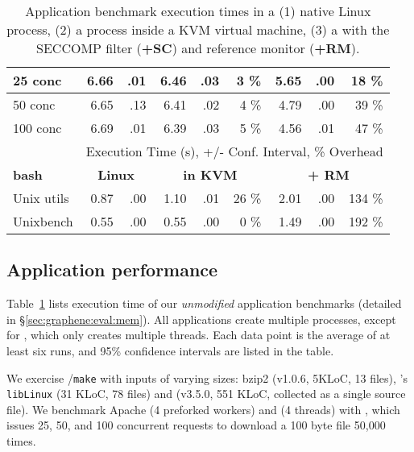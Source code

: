 \begin{table}[t!b!]
\begin{tabular}{|l|rr|rrr|rrr|}
25 conc    & 6.66 &.01 &6.46 &.03 &3 \% &5.65 &.00 &18 \%  \\\hline
50 conc    & 6.65 &.13 &6.41 &.02 &4 \% &4.79 &.00 &39 \%  \\\hline
100 conc   & 6.69 &.01 &6.39 &.03 &5 \% &4.56 &.01 &47 \%  \\\hline

\hline\hline

  & \multicolumn{8}{c|}{Execution Time (s), +/- Conf. Interval, \% Overhead} \\
\hline
{\bf bash } & \multicolumn{2}{c|}{\bf Linux} & \multicolumn{3}{c|}{{\bf in KVM}} & \multicolumn{3}{c|}{{\bf \graphene{} + RM}} \\
\hline

Unix utils & 0.87 & .00 & 1.10 & .01 & 26 \% & 2.01 & .00 & 134 \%  \\\hline
Unixbench  & 0.55 & .00 & 0.55 & .00 &  0 \% & 1.49 & .00 & 192 \%  \\\hline
\end{tabular}
\caption[Application benchmark results in Linux, KVM and \graphene{}]
{Application benchmark execution times in a (1) native Linux process, (2) a process inside a KVM virtual machine, (3) a \graphene{} \picoproc{} with the SECCOMP filter ({\bf +SC}) and reference monitor ({\bf +RM}). }
\label{tab:graphene:apps}
\end{table}


\subsection{Application performance}
\label{sec:eval:graphene:apps}

Table~\ref{tab:graphene:apps} lists 
execution time of our {\em unmodified} 
application benchmarks (detailed in \S\ref{sec:graphene:eval:mem}).
All applications create multiple processes,
except for \light{}, which only creates multiple threads.
Each data point is the average of at least six runs, 
and 95\% confidence intervals are listed in the table.

We exercise  {\tt \gcc{}}/{\tt make}
with inputs of varying sizes:
bzip2 (v1.0.6, 5KLoC, 13 files),
\graphene{}'s {\tt libLinux} (31 KLoC, 78 files)
and \gcc{} (v3.5.0, 551 KLoC, collected as a single source file). 
We benchmark Apache (4 preforked workers) and \light{} (4 threads) with 
\ab{},
which issues 25, 50, and 100 concurrent requests
to download a 100 byte file 50,000 times.

